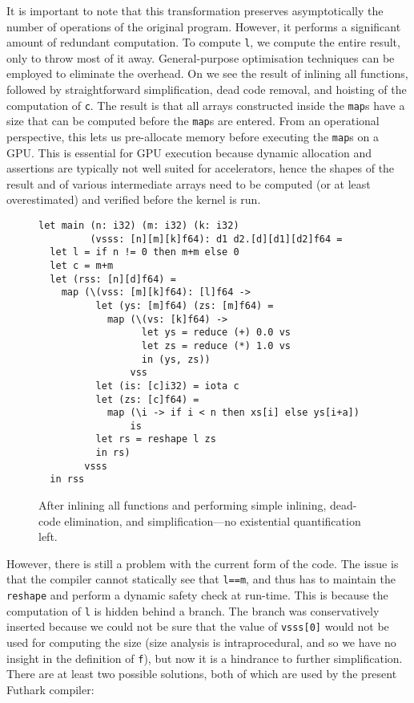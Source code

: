 It is important to note that this transformation preserves
asymptotically the number of operations of the original program.
However, it performs a significant amount of redundant computation.
To compute \lstinline{l}, we compute the entire result, only to throw
most of it away.  General-purpose optimisation techniques can be
employed to eliminate the overhead.  On
 we see the result of inlining all
functions, followed by straightforward simplification, dead code
removal, and hoisting of the computation of \lstinline{c}.  The result
is that all arrays constructed inside the \lstinline{map}s have a size
that can be computed before the \lstinline{map}s are entered.  From an
operational perspective, this lets us pre-allocate memory before
executing the \lstinline{map}s on a GPU.  This is essential for GPU
execution because dynamic allocation and assertions are typically not
well suited for accelerators, hence the shapes of the result and of
various intermediate arrays need to be computed (or at least
overestimated) and verified before the kernel is run.

\begin{figure}
\begin{lstlisting}
let main (n: i32) (m: i32) (k: i32)
         (vsss: [n][m][k]f64): d1 d2.[d][d1][d2]f64 =
  let l = if n != 0 then m+m else 0
  let c = m+m
  let (rss: [n][d]f64) =
    map (\(vss: [m][k]f64): [l]f64 ->
          let (ys: [m]f64) (zs: [m]f64) =
            map (\(vs: [k]f64) ->
                  let ys = reduce (+) 0.0 vs
                  let zs = reduce (*) 1.0 vs
                  in (ys, zs))
                vss
          let (is: [c]i32) = iota c
          let (zs: [c]f64) =
            map (\i -> if i < n then xs[i] else ys[i+a])
                is
          let rs = reshape l zs
          in rs)
        vsss
  in rss
\end{lstlisting}

  \caption{After inlining all functions and performing simple
    inlining, dead-code elimination, and simplification---no
    existential quantification left.}
\label{fig:SimplifyFShape}
\end{figure}

However, there is still a problem with the current form of the code.
The issue is that the compiler cannot statically see that
\lstinline{l==m}, and thus has to maintain the \lstinline{reshape} and
perform a dynamic safety check at run-time.  This is because the
computation of \lstinline{l} is hidden behind a branch.  The branch
was conservatively inserted because we could not be sure that the
value of \lstinline{vsss[0]} would not be used for computing the size
(size analysis is intraprocedural, and so we have no insight in the
definition of \lstinline{f}), but now it is a hindrance to further
simplification.  There are at least two possible solutions, both of
which are used by the present Futhark compiler:

